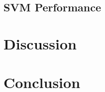 \documentclass{article}
\begin{document}
\subsection{SVM Performance}

\section{Discussion}
\label{sec:discussion}

\section{Conclusion}
\label{sec:conclusion}

\newpage
$\,$
\newpage



\end{document}
